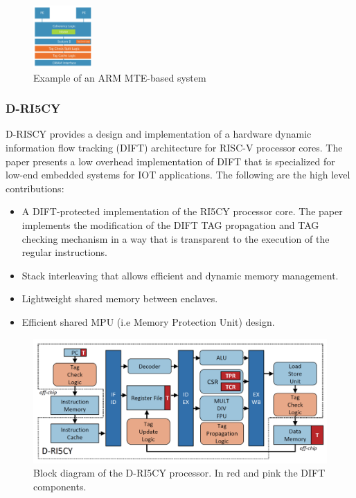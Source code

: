\begin{figure}[htbp!] 
  \centering    
  \includegraphics[width=0.2\textwidth]{ARMMTE}
  \caption[MTE]{Example of an ARM MTE-based system \cite{ARMMTE}}
  \label{fig:MTE}
  \end{figure}

\subsubsection{D-RI5CY}
D-RISCY\cite{D-RISCY} provides a design and implementation of a hardware dynamic information flow 
tracking (DIFT) architecture for RISC-V processor cores. The paper presents a low 
overhead implementation of DIFT that is specialized for low-end embedded systems
for IOT applications. The following are the high level contributions:
\begin{itemize}
  \item A DIFT-protected implementation of the RI5CY processor core. 
        The paper implements the modification of the DIFT TAG propagation and TAG checking
        mechanism in a way that is transparent to the execution of the regular instructions. 
  \item Stack interleaving that allows efficient and dynamic memory management.
  \item Lightweight shared memory between enclaves.
  \item Efficient shared MPU (i.e Memory Protection Unit) design.
\end{itemize}

\begin{figure}[htbp!] 
  \centering    
  \includegraphics[width=0.6  \textwidth]{D-RISCV}
  \caption[D-RISCY]{ Block diagram of the D-RI5CY processor. In red and pink the DIFT components. \cite{D-RISCY}}
  \label{fig:MTE}
  \end{figure}

